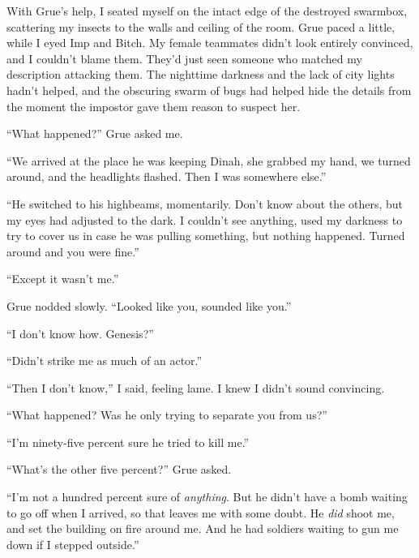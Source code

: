 





With Grue's help, I seated myself on the intact edge of the destroyed swarmbox, scattering my insects to the walls and ceiling of the room.  Grue paced a little, while I eyed Imp and Bitch.  My female teammates didn't look entirely convinced, and I couldn't blame them.  They'd just seen someone who matched my description attacking them.  The nighttime darkness and the lack of city lights hadn't helped, and the obscuring swarm of bugs had helped hide the details from the moment the impostor gave them reason to suspect her.



``What happened?'' Grue asked me.



``We arrived at the place he was keeping Dinah, she grabbed my hand, we turned around, and the headlights flashed.  Then I was somewhere else.''



``He switched to his highbeams, momentarily.  Don't know about the others, but my eyes had adjusted to the dark.  I couldn't see anything, used my darkness to try to cover us in case he was pulling something, but nothing happened.  Turned around and you were fine.''



``Except it wasn't me.''



Grue nodded slowly.  ``Looked like you, sounded like you.''



``I don't know how.  Genesis?''



``Didn't strike me as much of an actor.''



``Then I don't know,'' I said, feeling lame.  I knew I didn't sound convincing.



``What happened?  Was he only trying to separate you from us?''



``I'm ninety-five percent sure he tried to kill me.''



``What's the other five percent?''  Grue asked.



``I'm not a hundred percent sure of \emph{anything}.  But he didn't have a bomb waiting to go off when I arrived, so that leaves me with some doubt.  He \emph{did} shoot me, and set the building on fire around me.  And he had soldiers waiting to gun me down if I stepped outside.''



